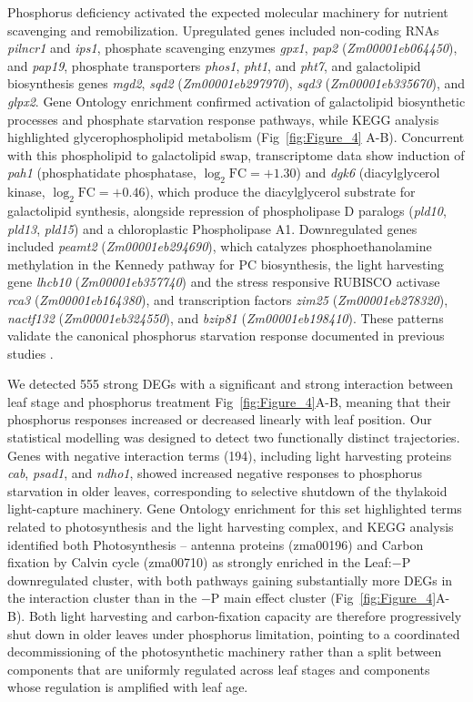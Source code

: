 \documentclass[9pt,twocolumn,twoside]{rilabRxiv}
\begin{document}
Phosphorus deficiency activated the expected molecular machinery for nutrient scavenging and remobilization.
Upregulated genes included non-coding RNAs \textit{pilncr1} and \textit{ips1}, phosphate scavenging enzymes \textit{gpx1}, \textit{pap2} (\textit{Zm00001eb064450}), and \textit{pap19}, phosphate transporters \textit{phos1}, \textit{pht1}, and \textit{pht7}, and galactolipid biosynthesis genes \textit{mgd2}, \textit{sqd2} (\textit{Zm00001eb297970}), \textit{sqd3} (\textit{Zm00001eb335670}), and \textit{glpx2}.
Gene Ontology enrichment confirmed activation of galactolipid biosynthetic processes and phosphate starvation response pathways, while KEGG analysis highlighted glycerophospholipid metabolism (Fig~\ref{fig:Figure_4} A-B).
Concurrent with this phospholipid to galactolipid swap, transcriptome data show induction of \textit{pah1} (phosphatidate phosphatase, $\log_2{\text{FC}}=+1.30$) and \textit{dgk6} (diacylglycerol kinase, $\log_2{\text{FC}}=+0.46$), which produce the diacylglycerol substrate for galactolipid synthesis, alongside repression of phospholipase D paralogs (\textit{pld10}, \textit{pld13}, \textit{pld15}) and a chloroplastic Phospholipase A1.
Downregulated genes included \textit{peamt2} (\textit{Zm00001eb294690}), which catalyzes phosphoethanolamine methylation in the Kennedy pathway for PC biosynthesis, the light harvesting gene \textit{lhcb10} (\textit{Zm00001eb357740}) and the stress responsive RUBISCO activase \textit{rca3} (\textit{Zm00001eb164380}), and transcription factors \textit{zim25} (\textit{Zm00001eb278320}), \textit{nactf132} (\textit{Zm00001eb324550}), and \textit{bzip81} (\textit{Zm00001eb198410}).
These patterns validate the canonical phosphorus starvation response documented in previous studies \cite{wang2020a,he2022}.

We detected 555 strong DEGs with a significant and strong interaction between leaf stage and phosphorus treatment Fig~\ref{fig:Figure_4}A-B, meaning that their phosphorus responses increased or decreased linearly with leaf position.
Our statistical modelling was designed to detect two functionally distinct trajectories.
Genes with negative interaction terms (194), including light harvesting proteins \textit{cab}, \textit{psad1}, and \textit{ndho1}, showed increased negative responses to phosphorus starvation in older leaves, corresponding to selective shutdown of the thylakoid light-capture machinery.
Gene Ontology enrichment for this set highlighted terms related to photosynthesis and the light harvesting complex, and KEGG analysis identified both Photosynthesis -- antenna proteins (zma00196) and Carbon fixation by Calvin cycle (zma00710) as strongly enriched in the Leaf:$-$P downregulated cluster, with both pathways gaining substantially more DEGs in the interaction cluster than in the $-$P main effect cluster (Fig~\ref{fig:Figure_4}A-B).
Both light harvesting and carbon-fixation capacity are therefore progressively shut down in older leaves under phosphorus limitation, pointing to a coordinated decommissioning of the photosynthetic machinery rather than a split between components that are uniformly regulated across leaf stages and components whose regulation is amplified with leaf age.
\end{document}
